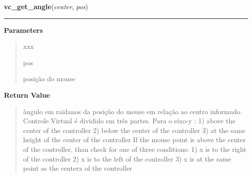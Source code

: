     \label{virtual_controller:vc_get_angle}

    \vspace{0.5ex}

\hspace{.8\funcindent}\begin{boxedminipage}{\funcwidth}

    \raggedright \textbf{vc\_get\_angle}(\textit{center}, \textit{pos})

    \vspace{-1.5ex}

    \rule{\textwidth}{0.5\fboxrule}
\setlength{\parskip}{2ex}
\setlength{\parskip}{1ex}
      \textbf{Parameters}
      \vspace{-1ex}

      \begin{quote}
        \begin{Ventry}{xxx}

          \item[pos]

          posição do mouse

        \end{Ventry}

      \end{quote}

      \textbf{Return Value}
    \vspace{-1ex}

      \begin{quote}
      ângulo em raidanos da posição do mouse em relação ao centro 
      informado. Controle Virtual é dividido em três partes. Para o eixo-y 
      : 1) above the center of the controller 2) below the center of the 
      controller 3) at the same height of the center of the controller If 
      the mouse point is above the center of the controller, than check for
      one of three conditions: 1) x is to the right of the controller 2) x 
      is to the left of the controller 3) x is at the same point as the 
      centerx of the controller

      \end{quote}

    \end{boxedminipage}



